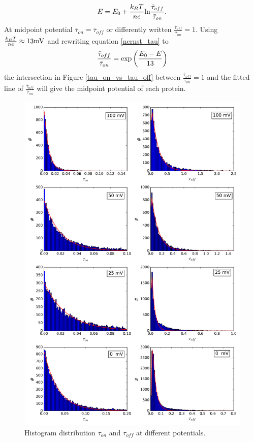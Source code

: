 \documentclass[twoside,single]{lion-msc}
\begin{document}
\begin{equation}\label{nernst_tau}
E = E_{0}+\frac{k_{B}T}{ne}\textup{ln}\frac{\bar{\tau}_{off}}{\bar{\tau}_{on}}.
\end{equation}
At midpoint potential $\bar{\tau}_{on} = \bar{\tau}_{off}$ or differently written $\frac{\bar{\tau}_{off}}{\bar{\tau}_{on}} = 1$. Using $\frac{k_{B}T}{ne} \approx  13 \textup{mV}$ and rewriting equation \ref{nernst_tau} to
\begin{equation}\label{fit_onoff}
\frac{\bar{\tau}_{off}}{\bar{\tau}_{on}} = \textup{exp}\left ( \frac{E_{0}-E}{13} \right )
\end{equation}
the intersection in Figure \ref{tau_on_vs_tau_off} between $\frac{\bar{\tau}_{off}}{\bar{\tau}_{on}} = 1$ and the fitted line of $\frac{\bar{\tau}_{off}}{\bar{\tau}_{on}}$ will give the midpoint potential of each protein.
\begin{figure}[ht!]
\centering
\includegraphics[width=.9\textwidth]{histograms_thesis}
\caption{Histogram distribution $\tau_{on}$ and $\tau_{off}$ at different potentials.}
\label{histograms_disc}
\end{figure}
\end{document}
